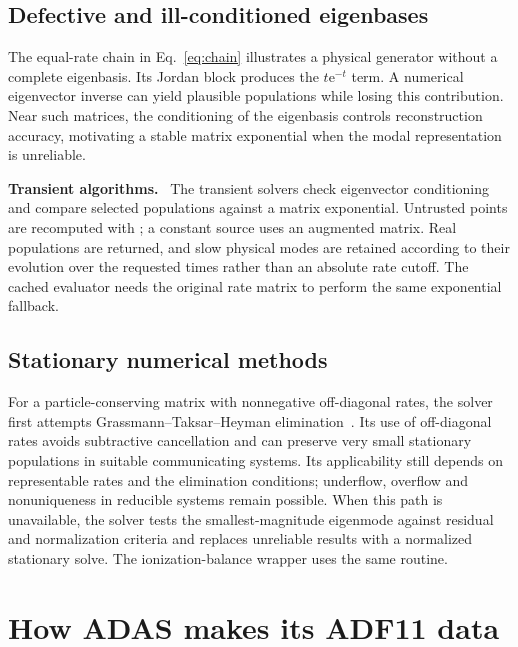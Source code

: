 \documentclass[11pt,a4paper]{article}
\newcommand{\routine}[1]{\textsf{\detokenize{#1}}}
\newcommand{\ee}{\mathrm{e}}
\newenvironment{implnote}[1][Implementation]{%
  \par\smallskip\noindent\begin{lrbox}{\notebox}\setlength{\fboxsep}{6pt}\begin{minipage}{\dimexpr\linewidth-2\fboxsep-2\fboxrule\relax}\small\textbf{#1.}\ }{%
  \end{minipage}\end{lrbox}\setlength{\fboxsep}{6pt}\fcolorbox{noteframe}{notebg}{\usebox{\notebox}}\par\smallskip}
\numberwithin{equation}{section}
\begin{document}
\subsection{Defective and ill-conditioned eigenbases}

The equal-rate chain in Eq.~\eqref{eq:chain} illustrates a physical
generator without a complete eigenbasis. Its Jordan block produces
the $t\ee^{-t}$ term. A numerical eigenvector inverse can yield
plausible populations while losing this contribution. Near such
matrices, the conditioning of the eigenbasis controls reconstruction
accuracy, motivating a stable matrix exponential when the modal
representation is unreliable.

\begin{implnote}[Transient algorithms]
The transient solvers check eigenvector conditioning and compare selected
populations against a matrix exponential. Untrusted points are recomputed
with \routine{scipy.linalg.expm}; a constant source uses an augmented matrix.
Real populations are returned, and slow physical modes are retained according
to their evolution over the requested times rather than an absolute rate
cutoff. The cached evaluator needs the original rate matrix to perform the
same exponential fallback.
\end{implnote}

\subsection{Stationary numerical methods}

For a particle-conserving matrix with nonnegative off-diagonal rates,
the solver first attempts Grassmann--Taksar--Heyman
elimination~\cite{gth}. Its use of off-diagonal rates avoids
subtractive cancellation and can preserve very small stationary
populations in suitable communicating systems. Its applicability
still depends on representable rates and the elimination conditions;
underflow, overflow and nonuniqueness in reducible systems remain
possible. When this path is unavailable, the solver tests the
smallest-magnitude eigenmode against residual and normalization
criteria and replaces unreliable results with a normalized
stationary solve. The ionization-balance wrapper uses the same routine.

\section{How ADAS makes its ADF11 data}\label{sec:adf11adas}
\end{document}
